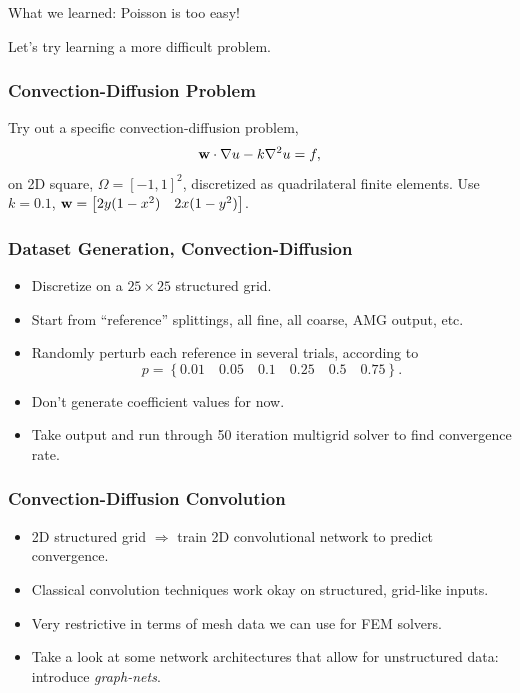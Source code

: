 \documentclass[handout]{beamer}
\renewcommand{\vec}[1]{ {\bf #1} }
\begin{document}
\begin{frame}
  What we learned: \pause Poisson is too easy!
  \newline\newline
  \pause

  Let's try learning a more difficult problem.
\end{frame}


\begin{frame}
  \frametitle{Convection-Diffusion Problem}
  Try out a specific convection-diffusion problem,
  \[\vec{w}\cdot\nabla u -k\nabla^2u = f,\]
  on 2D square, $\Omega = \left[-1,1\right]^2$, discretized as quadrilateral finite elements.  Use  $k=0.1$, $\vec{w} = \begin{bmatrix} 2y(1-x^2) & 2x(1-y^2)  \end{bmatrix}$.
\end{frame}


\begin{frame}
  \frametitle{Dataset Generation, Convection-Diffusion}
  \begin{itemize}
  \item Discretize on a $25 \times 25$ structured grid.
  \item Start from ``reference'' splittings, all fine, all coarse, AMG output, etc.
  \item Randomly perturb each reference in several trials, according to \[ p = \left\{ 0.01 \quad 0.05 \quad 0.1 \quad 0.25 \quad 0.5 \quad 0.75 \right\}. \]
  \item Don't generate coefficient values for now.
  \item Take output and run through 50 iteration multigrid solver to find convergence rate.
  \end{itemize}
\end{frame}


\begin{frame}
  \frametitle{Convection-Diffusion Convolution}
  \begin{itemize}
    \item 2D structured grid $\Rightarrow$ train 2D convolutional network to predict convergence.
  \end{itemize}
\end{frame}


\begin{frame}
  \begin{itemize}
  \item Classical convolution techniques work okay on structured, grid-like inputs.
  \item Very restrictive in terms of mesh data we can use for FEM solvers.
  \item Take a look at some network architectures that allow for unstructured data: introduce \textit{graph-nets}.
  \end{itemize}
\end{frame}
\end{document}
